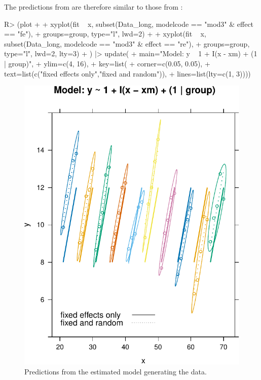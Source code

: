 \documentclass[
]{jss}
\begin{document}
The predictions from  are therefore similar to those from
:

\begin{CodeChunk}
\begin{CodeInput}
R> (plot +
+   xyplot(fit ~ x, subset(Data_long, modelcode == "mod3" & effect == "fe"),
+          groups=group, type="l", lwd=2) +
+   xyplot(fit ~ x, subset(Data_long, modelcode == "mod3" & effect == "re"),
+          groups=group, type="l", lwd=2, lty=3)
+ ) |> update(
+   main="Model: y ~ 1 + I(x - xm) + (1 | group)",
+   ylim=c(4, 16),
+   key=list(
+     corner=c(0.05, 0.05),
+     text=list(c("fixed effects only","fixed and random")),
+     lines=list(lty=c(1, 3))))
\end{CodeInput}
\begin{figure}

{\centering \includegraphics[width=1\linewidth]{JSS-article_files/figure-latex/plot-fits-mod3-1} 

}

\caption[Predictions from the estimated model generating the data]{Predictions from the estimated model generating the data.}\label{fig:plot-fits-mod3}
\end{figure}
\end{CodeChunk}
\end{document}
